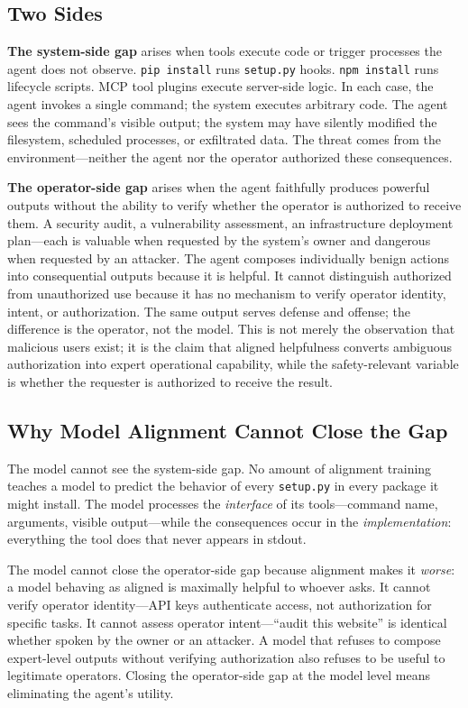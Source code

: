 \documentclass{article}
\begin{document}
\subsection{Two Sides}

\textbf{The system-side gap} arises when tools execute code or trigger processes the agent does not observe. \texttt{pip install} runs \texttt{setup.py} hooks. \texttt{npm install} runs lifecycle scripts. MCP tool plugins execute server-side logic. In each case, the agent invokes a single command; the system executes arbitrary code. The agent sees the command's visible output; the system may have silently modified the filesystem, scheduled processes, or exfiltrated data. The threat comes from the environment---neither the agent nor the operator authorized these consequences.

\textbf{The operator-side gap} arises when the agent faithfully produces powerful outputs without the ability to verify whether the operator is authorized to receive them. A security audit, a vulnerability assessment, an infrastructure deployment plan---each is valuable when requested by the system's owner and dangerous when requested by an attacker. The agent composes individually benign actions into consequential outputs because it is helpful. It cannot distinguish authorized from unauthorized use because it has no mechanism to verify operator identity, intent, or authorization. The same output serves defense and offense; the difference is the operator, not the model. This is not merely the observation that malicious users exist; it is the claim that aligned helpfulness converts ambiguous authorization into expert operational capability, while the safety-relevant variable is whether the requester is authorized to receive the result.

\subsection{Why Model Alignment Cannot Close the Gap}

The model cannot see the system-side gap. No amount of alignment training teaches a model to predict the behavior of every \texttt{setup.py} in every package it might install. The model processes the \emph{interface} of its tools---command name, arguments, visible output---while the consequences occur in the \emph{implementation}: everything the tool does that never appears in stdout.

The model cannot close the operator-side gap because alignment makes it \emph{worse}: a model behaving as aligned is maximally helpful to whoever asks. It cannot verify operator identity---API keys authenticate access, not authorization for specific tasks. It cannot assess operator intent---``audit this website'' is identical whether spoken by the owner or an attacker. A model that refuses to compose expert-level outputs without verifying authorization also refuses to be useful to legitimate operators. Closing the operator-side gap at the model level means eliminating the agent's utility.
\end{document}
